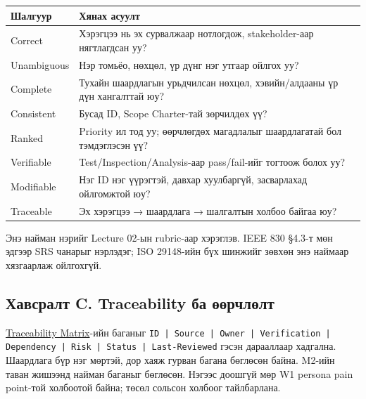 \begin{longtable}[]{@{}
  >{\raggedright\arraybackslash}p{}
  >{\raggedright\arraybackslash}p{}@{}}
\toprule\noalign{}
\begin{minipage}[b]{\linewidth}\raggedright
Шалгуур
\end{minipage} & \begin{minipage}[b]{\linewidth}\raggedright
Хянах асуулт
\end{minipage} \\
\midrule\noalign{}
\endhead
\bottomrule\noalign{}
\endlastfoot
Correct & Хэрэгцээ нь эх сурвалжаар нотлогдож, stakeholder-аар
нягтлагдсан уу? \\
Unambiguous & Нэр томьёо, нөхцөл, үр дүнг нэг утгаар ойлгох уу? \\
Complete & Тухайн шаардлагын урьдчилсан нөхцөл, хэвийн/алдааны үр дүн
хангалттай юу? \\
Consistent & Бусад ID, Scope Charter-тай зөрчилдөх үү? \\
Ranked & Priority ил тод уу; өөрчлөгдөх магадлалыг шаардлагатай бол
тэмдэглэсэн үү? \\
Verifiable & Test/Inspection/Analysis-аар pass/fail-ийг тогтоож болох
уу? \\
Modifiable & Нэг ID нэг үүрэгтэй, давхар хуулбаргүй, засварлахад
ойлгомжтой юу? \\
Traceable & Эх хэрэгцээ → шаардлага → шалгалтын холбоо байгаа юу? \\
\end{longtable}

Энэ найман нэрийг Lecture 02-ын rubric-аар хэрэглэв. IEEE 830 §4.3-т мөн
эдгээр SRS чанарыг нэрлэдэг; ISO 29148-ийн бүх шинжийг зөвхөн энэ
наймаар хязгаарлаж ойлгохгүй.

\subsection{Хавсралт C. Traceability ба
өөрчлөлт}\label{doc3-ux445ux430ux432ux441ux440ux430ux43bux442-c.-traceability-ux431ux430-ux4e9ux4e9ux440ux447ux43bux4e9ux43bux442}

\href{../../requirements/traceability-matrix.md}{Traceability
Matrix}-ийн баганыг
\nolinkurl{ID | Source | Owner | Verification | Dependency | Risk | Status | Last-Reviewed}
гэсэн дарааллаар хадгална. Шаардлага бүр нэг мөртэй, дор хаяж гурван
багана бөглөсөн байна. M2-ийн таван жишээнд найман баганыг бөглөсөн.
Нэгээс доошгүй мөр W1 persona pain point-той холбоотой байна; төсөл
сольсон холбоог тайлбарлана.

